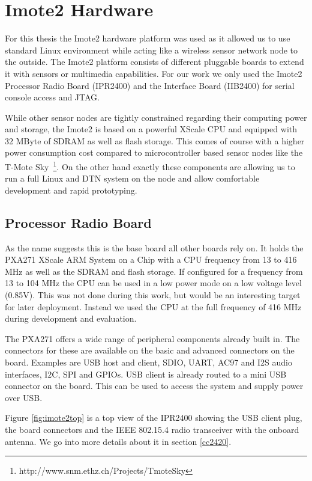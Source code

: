 \chapter{Imote2 Hardware}
For this thesis the Imote2 \cite{imote2} hardware platform was used as it allowed us to use
standard Linux environment while acting like a wireless sensor network node to
the outside. The Imote2 platform
consists of different pluggable boards to extend it with sensors or multimedia
capabilities. For our work we only used the Imote2 Processor Radio Board
(IPR2400) and the Interface Board (IIB2400) for serial console access and JTAG.

While other sensor nodes are tightly constrained regarding their computing power
and storage, the Imote2 is based on a powerful XScale CPU and equipped with 32
MByte of SDRAM as well as flash storage. This comes of course with a higher power
consumption cost compared to microcontroller based sensor nodes like the T-Mote
Sky~\footnote{http://www.snm.ethz.ch/Projects/TmoteSky}. On the other hand
exactly these components are allowing us to run a full
Linux and DTN system on the node and allow comfortable development and rapid
prototyping.

\section{Processor Radio Board}
As the name suggests this is the base board all other boards rely on. It holds
the PXA271 XScale ARM System on a Chip with a CPU frequency from 13 to 416 MHz
as well as the SDRAM and flash storage. If configured for a frequency from 13
to 104 MHz the CPU can be used in a low power mode on a low voltage level
(0.85V). This was not done during this work, but would be an interesting target
for later deployment. Instead we used the CPU at the full frequency of 416 MHz
during development and evaluation.

The PXA271 offers a wide range of peripheral components already built in. The
connectors for these are available on the basic and advanced connectors on the
board. Examples are USB host and client, SDIO, UART, AC97 and I2S audio
interfaces, I2C, SPI and GPIOs. USB client is already routed to a mini USB
connector on the board. This can be used to access the system and supply power
over USB.

Figure \ref{fig:imote2top} is a top view of the IPR2400 showing the USB client plug,
the board connectors and the IEEE 802.15.4 radio transceiver with the onboard
antenna. We go into more details about it in section \ref{cc2420}.

